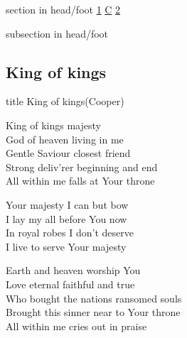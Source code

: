 \documentclass{beamer}
\begin{document}
{
{ 
 {
 \begin{beamercolorbox}[ht=4.5ex,dp=1.5ex,%
      leftskip=.3cm,rightskip=.3cm plus1fil]{section in head/foot}
 \fontsize{12}{25}\selectfont 
\hyperlink{King of kings[](Cooper)1}{1}
\hyperlink{King of kings[](Cooper)C}{C}
\hyperlink{King of kings[](Cooper)2}{2}
 
 \end{beamercolorbox}%
  \begin{beamercolorbox}[ht=2.5ex,dp=1.125ex,%
   leftskip=.3cm,rightskip=.3cm plus1fil]{subsection in head/foot}
   \insertauthor
 \end{beamercolorbox}%
 }
}
\subsection{ King of kings }

\hypertarget{King of kings[](Cooper)}{}
\begin{frame}{}
 \vfill
  \centering
  \begin{beamercolorbox}[sep=8pt,center,shadow=true,rounded=true]{title}
    King of kings(Cooper)    
  \end{beamercolorbox}
  \vfill
\end{frame}

\hypertarget{King of kings[](Cooper)1}{}
\begin{frame}{}
\fontsize{ 18 }{ 23 }\selectfont

King of kings majesty\\ 
God of heaven living in me\\ 
Gentle Saviour closest friend\\ 
Strong deliv'rer beginning and end\\ 
All within me falls at Your throne 

\end{frame}

\hypertarget{King of kings[](Cooper)C}{}
\begin{frame}{}
\fontsize{ 18 }{ 23 }\selectfont

Your majesty I can but bow\\ 
I lay my all before You now\\ 
In royal robes I don't deserve\\ 
I live to serve Your majesty 

\end{frame}

\hypertarget{King of kings[](Cooper)2}{}
\begin{frame}{}
\fontsize{ 18 }{ 23 }\selectfont

Earth and heaven worship You\\ 
Love eternal faithful and true\\ 
Who bought the nations ransomed souls\\ 
Brought this sinner near to Your throne\\ 
All within me cries out in praise 

\end{frame}

}
\end{document}
